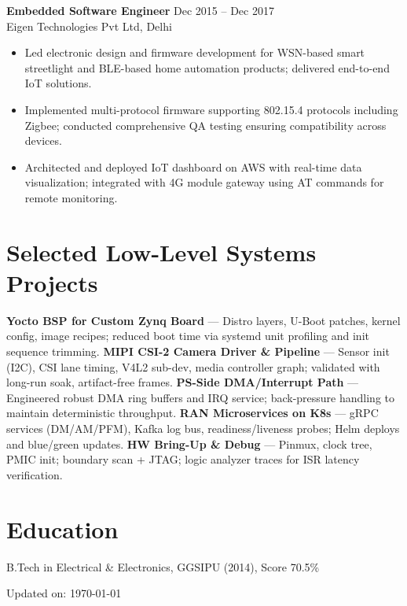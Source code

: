 \documentclass[11pt,a4paper]{article}
\newcommand{\resumeBullet}[1]{\item #1}
\begin{document}
\textbf{Embedded Software Engineer} \hfill Dec 2015 -- Dec 2017 \\
Eigen Technologies Pvt Ltd, Delhi
\begin{itemize}
  \resumeBullet{Led electronic design and firmware development for WSN-based smart streetlight and BLE-based home automation products; delivered end-to-end IoT solutions.}
  \resumeBullet{Implemented multi-protocol firmware supporting 802.15.4 protocols including Zigbee; conducted comprehensive QA testing ensuring compatibility across devices.}
  \resumeBullet{Architected and deployed IoT dashboard on AWS with real-time data visualization; integrated with 4G module gateway using AT commands for remote monitoring.}
\end{itemize}

\section*{Selected Low-Level Systems Projects}
\textbf{Yocto BSP for Custom Zynq Board} — Distro layers, U-Boot patches, kernel config, image recipes; reduced boot time via systemd unit profiling and init sequence trimming. 
\newline
\textbf{MIPI CSI-2 Camera Driver \& Pipeline} — Sensor init (I2C), CSI lane timing, V4L2 sub-dev, media controller graph; validated with long-run soak, artifact-free frames.
\newline
\textbf{PS-Side DMA/Interrupt Path} — Engineered robust DMA ring buffers and IRQ service; back-pressure handling to maintain deterministic throughput.
\newline
\textbf{RAN Microservices on K8s} — gRPC services (DM/AM/PFM), Kafka log bus, readiness/liveness probes; Helm deploys and blue/green updates.
\newline
\textbf{HW Bring-Up \& Debug} — Pinmux, clock tree, PMIC init; boundary scan + JTAG; logic analyzer traces for ISR latency verification.

\section*{Education}
B.Tech in Electrical \& Electronics, GGSIPU (2014), Score 70.5\%

\vfill
\footnotesize Updated on: \today

\end{document}
